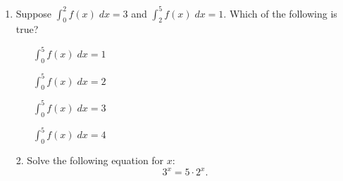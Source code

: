 \documentclass[11pt]{article}
\begin{document}
\pagestyle{empty}
\newsavebox{\quizfront}
\begin{lrbox}{\quizfront}
\begin{minipage}[top][4.5in][t]{\textwidth} \setlength{\parindent}{1.5em}
\drawtitle
\vspace{-0.5in}
\begin{enumerate}

\item Suppose $\displaystyle\int_0^2 f(x)\;dx = 3$ and
  $\displaystyle\int_2^5 f(x)\;dx = 1$. Which of the following is
  true?

  \vfill

  \begin{itemize}
  \item[\textbigcircle] $\displaystyle\int_0^5 f(x)\;dx = 1$
    \vfill
  \item[\textbigcircle] $\displaystyle\int_0^5 f(x)\;dx = 2$
    \vfill
  \item[\textbigcircle] $\displaystyle\int_0^5 f(x)\;dx = 3$
    \vfill
  \item[\textbigcircle] $\displaystyle\int_0^5 f(x)\;dx = 4$
    \vfill
  \end{itemize}



\end{enumerate}



\end{minipage}
\end{lrbox}

\newsavebox{\quizback}
\begin{lrbox}{\quizback}
\begin{minipage}[top][4.5in][t]{\textwidth} \setlength{\parindent}{1.5em}
\begin{itemize}
\item[2.] Solve the following equation for $x$:
  \[
  3^x = 5\cdot 2^x.
  \]


\end{itemize}
\end{minipage}
\end{lrbox}

\noindent \usebox{\quizfront}
\vfill
\noindent \usebox{\quizfront}

\end{document}
